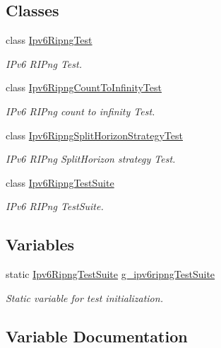 \subsection*{Classes}
\begin{DoxyCompactItemize}
\item 
class \hyperlink{classIpv6RipngTest}{Ipv6\+Ripng\+Test}
\begin{DoxyCompactList}\small\item\em I\+Pv6 R\+I\+Png Test. \end{DoxyCompactList}\item 
class \hyperlink{classIpv6RipngCountToInfinityTest}{Ipv6\+Ripng\+Count\+To\+Infinity\+Test}
\begin{DoxyCompactList}\small\item\em I\+Pv6 R\+I\+Png count to infinity Test. \end{DoxyCompactList}\item 
class \hyperlink{classIpv6RipngSplitHorizonStrategyTest}{Ipv6\+Ripng\+Split\+Horizon\+Strategy\+Test}
\begin{DoxyCompactList}\small\item\em I\+Pv6 R\+I\+Png Split\+Horizon strategy Test. \end{DoxyCompactList}\item 
class \hyperlink{classIpv6RipngTestSuite}{Ipv6\+Ripng\+Test\+Suite}
\begin{DoxyCompactList}\small\item\em I\+Pv6 R\+I\+Png Test\+Suite. \end{DoxyCompactList}\end{DoxyCompactItemize}
\subsection*{Variables}
\begin{DoxyCompactItemize}
\item 
static \hyperlink{classIpv6RipngTestSuite}{Ipv6\+Ripng\+Test\+Suite} \hyperlink{ipv6-ripng-test_8cc_a35322302d0c2dffb5e744158ec9e3ba3}{g\+\_\+ipv6ripng\+Test\+Suite}
\begin{DoxyCompactList}\small\item\em Static variable for test initialization. \end{DoxyCompactList}\end{DoxyCompactItemize}


\subsection{Variable Documentation}
